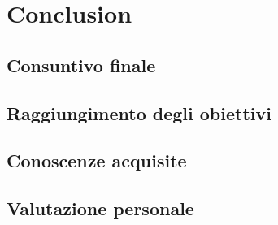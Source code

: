 \chapter{Conclusion}
\label{cap:conclusioni}

\section{Consuntivo finale}

\section{Raggiungimento degli obiettivi}

\section{Conoscenze acquisite}

\section{Valutazione personale}
